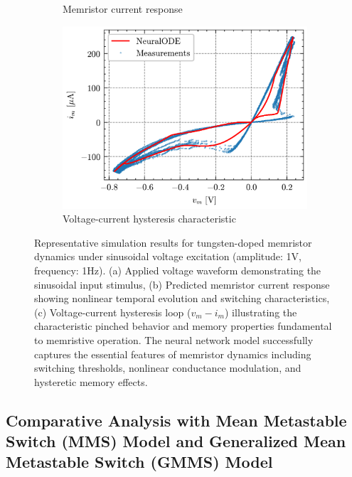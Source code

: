 \documentclass[11pt, oneside]{article}
\begin{document}
\begin{figure}[H]
\begin{subfigure}[b]{\subwidth}
        \caption{Memristor current response}
    \end{subfigure}
    \begin{subfigure}[b]{\subwidth}
        \includegraphics[width=\linewidth]{sample_results/hysteresis.png}
        \caption{Voltage-current hysteresis characteristic}
    \end{subfigure}
    \caption{Representative simulation results for tungsten-doped memristor dynamics under sinusoidal voltage excitation (amplitude: 1V, frequency: 1Hz). (a) Applied voltage waveform demonstrating the sinusoidal input stimulus, (b) Predicted memristor current response showing nonlinear temporal evolution and switching characteristics, (c) Voltage-current hysteresis loop ($v_m - i_m$) illustrating the characteristic pinched behavior and memory properties fundamental to memristive operation. The neural network model successfully captures the essential features of memristor dynamics including switching thresholds, nonlinear conductance modulation, and hysteretic memory effects.}
    \label{fig:sample-results}
\end{figure}



\clearpage

\subsection{Comparative Analysis with Mean Metastable Switch (MMS) Model and Generalized Mean Metastable Switch (GMMS) Model}
\end{document}
